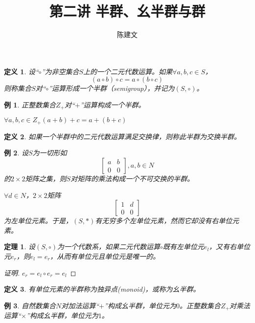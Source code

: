 \documentclass{article}
\newtheorem{Def}{定义}
\newtheorem{Thm}{定理}
\newtheorem*{Example}{例}
\begin{document}
\begin{CJK*}{UTF8}{gbsn}
  \title{第二讲 半群、幺半群与群}
  \author{陈建文}
  \maketitle
  


\begin{Def}
设“$\circ$”为非空集合$S$上的一个二元代数运算。如果$\forall a,b,c \in S$，
\[(a\circ b) \circ c = a \circ (b\circ c)\]
则称集合$S$对“$\circ$”运算形成一个半群（semigroup），并记为$(S,\circ)$。  
\end{Def}

\begin{Example}
  正整数集合$Z_+$对“$+$”运算构成一个半群。
\end{Example}

$\forall a,b,c \in Z_+ (a+b)+c = a + (b + c)$

\begin{Def}
  如果一个半群中的二元代数运算满足交换律，则称此半群为交换半群。
\end{Def}

\begin{Example}
  设$S$为一切形如
  \[\begin{bmatrix}
    a&b\\
    0&0
  \end{bmatrix},a,b\in N\]
的$2\times 2$矩阵之集，则$S$对矩阵的乘法构成一个不可交换的半群。

$\forall d\in N$，$2\times 2$矩阵
\[\begin{bmatrix}1&d\\0&0\end{bmatrix}\]
为左单位元素。于是，$(S,*)$有无穷多个左单位元素，然而它却没有右单位元素。
\end{Example}

\begin{Thm}
  设$(S,\circ)$为一个代数系，如果二元代数运算$\circ$既有左单位元$e_l$，又有右单位元$e_r$，则$e_l=e_r$，从而有单位元且单位元是唯一的。
\end{Thm}
\begin{proof}[证明]
  $e_r=e_l\circ e_r=e_l$
\end{proof}
\begin{Def}
  有单位元素的半群称为独异点(monoid)，或称为幺半群。
\end{Def}

\begin{Example}
  自然数集合$N$对加法运算“$+$”构成幺半群，单位元为$0$。正整数集合$Z_+$对乘法运算“$\times$”构成幺半群，单位元为$1$。
\end{Example}


\end{CJK*}
\end{document}
